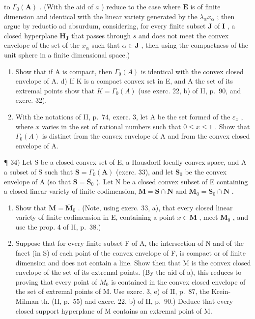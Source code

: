 to \(\Gamma_0(\mathbf{A})\) . (With the aid of \(a\) ) reduce to the case where \(\mathbf{E}\) is of finite dimension and identical with the linear variety generated by the \(\lambda_{\alpha}x_{\alpha}\) ; then argue by reductio ad absurdum, considering, for every finite subset \(\mathbf{J}\) of \(\mathbf{I}\) , a closed hyperplane \(\mathbf{H}_{\mathbf{J}}\) that passes through \(s\) and does not meet the convex envelope of the set of the \(x_{\alpha}\) such that \(\alpha \in \mathbf{J}\) , then using the compactness of the unit sphere in a finite dimensional space.)

\begin{enumerate}
\def\labelenumi{\alph{enumi})}
\setcounter{enumi}{2}
\item
  Show that if A is compact, then \(\Gamma_0(A)\) is identical with the convex closed envelope of A. d) If K is a compact convex set in E, and A the set of its extremal points show that \(K = \Gamma_0(A)\) (use exerc. 22, b) of II, p.~90, and exerc. 32).
\item
  With the notations of II, p.~74, exerc. 3, let A be the set formed of the \(\varepsilon_{x}\) , where \(x\) varies in the set of rational numbers such that \(0 \leqslant x \leqslant 1\) . Show that \(\Gamma_0(A)\) is distinct from the convex envelope of A and from the convex closed envelope of A.
\end{enumerate}

¶ 34) Let S be a closed convex set of E, a Hausdorff locally convex space, and A a subset of S such that \(\mathbf{S} = \Gamma_0(\mathbf{A})\) (exerc. 33), and let \(\mathbf{S}_0\) be the convex envelope of A (so that \(\mathbf{S} = \bar{\mathbf{S}}_0\) ). Let N be a closed convex subset of E containing a closed linear variety of finite codimension, \(\mathbf{M} = \mathbf{S} \cap \mathbf{N}\) and \(\mathbf{M}_0 = \mathbf{S}_0 \cap \mathbf{N}\) .

\begin{enumerate}
\def\labelenumi{\alph{enumi})}
\item
  Show that \(\mathbf{M} = \overline{\mathbf{M}}_0\) . (Note, using exerc. 33, a), that every closed linear variety of finite codimension in E, containing a point \(x \in \mathbf{M}\) , meet \(\mathbf{M}_0\) , and use the prop. 4 of II, p.~38.)
\item
  Suppose that for every finite subset F of A, the intersection of N and of the facet (in S) of each point of the convex envelope of F, is compact or of finite dimension and does not contain a line. Show then that M is the convex closed envelope of the set of its extremal points. (By the aid of a), this reduces to proving that every point of \(M_{0}\) is contained in the convex closed envelope of the set of extremal points of M. Use exerc. 3, e) of II, p.~87, the Krein-Milman th. (II, p.~55) and exerc. 22, b) of II, p.~90.) Deduce that every closed support hyperplane of M contains an extremal point of M.
\end{enumerate}


